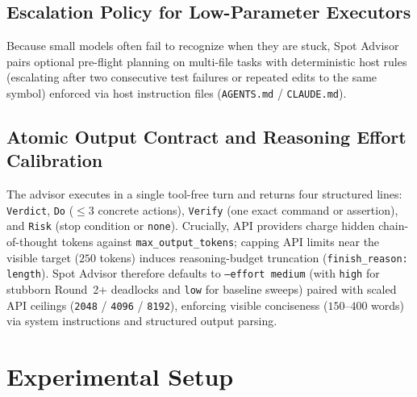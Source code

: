 \documentclass[11pt]{article}
\begin{document}
\subsection{Escalation Policy for Low-Parameter Executors}
Because small models often fail to recognize when they are stuck, Spot Advisor pairs optional pre-flight planning on multi-file tasks with deterministic host rules (escalating after two consecutive test failures or repeated edits to the same symbol) enforced via host instruction files (\texttt{AGENTS.md} / \texttt{CLAUDE.md}).

\subsection{Atomic Output Contract and Reasoning Effort Calibration}
The advisor executes in a single tool-free turn and returns four structured lines: \texttt{Verdict}, \texttt{Do} ($\le 3$ concrete actions), \texttt{Verify} (one exact command or assertion), and \texttt{Risk} (stop condition or \texttt{none}). Crucially, API providers charge hidden chain-of-thought tokens against \texttt{max\_output\_tokens}; capping API limits near the visible target ($250$ tokens) induces reasoning-budget truncation (\texttt{finish\_reason: length}). Spot Advisor therefore defaults to \texttt{--effort medium} (with \texttt{high} for stubborn Round~2+ deadlocks and \texttt{low} for baseline sweeps) paired with scaled API ceilings (\texttt{2048} / \texttt{4096} / \texttt{8192}), enforcing visible conciseness ($150\text{--}400$ words) via system instructions and structured output parsing.

\section{Experimental Setup}
\label{sec:setup}
\end{document}
